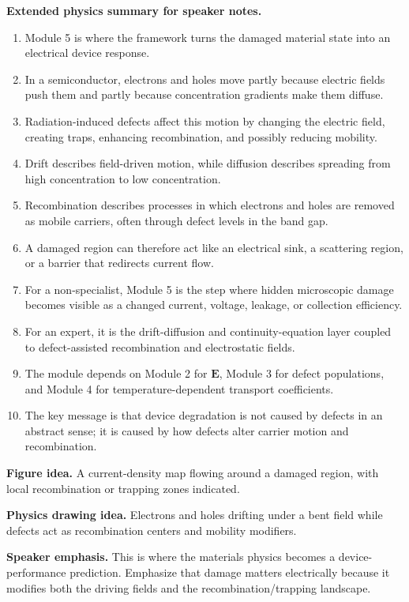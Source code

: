 \documentclass[11pt]{article}
\begin{document}
\textbf{Extended physics summary for speaker notes.}
\begin{enumerate}[leftmargin=1.6em]
    \item Module 5 is where the framework turns the damaged material state into an electrical device response.
    \item In a semiconductor, electrons and holes move partly because electric fields push them and partly because concentration gradients make them diffuse.
    \item Radiation-induced defects affect this motion by changing the electric field, creating traps, enhancing recombination, and possibly reducing mobility.
    \item Drift describes field-driven motion, while diffusion describes spreading from high concentration to low concentration.
    \item Recombination describes processes in which electrons and holes are removed as mobile carriers, often through defect levels in the band gap.
    \item A damaged region can therefore act like an electrical sink, a scattering region, or a barrier that redirects current flow.
    \item For a non-specialist, Module 5 is the step where hidden microscopic damage becomes visible as a changed current, voltage, leakage, or collection efficiency.
    \item For an expert, it is the drift-diffusion and continuity-equation layer coupled to defect-assisted recombination and electrostatic fields.
    \item The module depends on Module 2 for \(\bm{E}\), Module 3 for defect populations, and Module 4 for temperature-dependent transport coefficients.
    \item The key message is that device degradation is not caused by defects in an abstract sense; it is caused by how defects alter carrier motion and recombination.
\end{enumerate}

\textbf{Figure idea.} A current-density map flowing around a damaged region, with local recombination or trapping zones indicated.

\textbf{Physics drawing idea.} Electrons and holes drifting under a bent field while defects act as recombination centers and mobility modifiers.

\textbf{Speaker emphasis.} This is where the materials physics becomes a device-performance prediction. Emphasize that damage matters electrically because it modifies both the driving fields and the recombination/trapping landscape.
\end{document}
